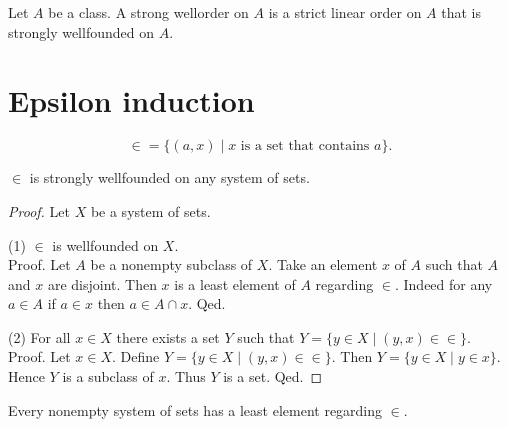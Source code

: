 \documentclass[../../set-theory/set-theory.tex]{subfiles}
\begin{document}
  \begin{forthel}
    \begin{definition}
      Let $A$ be a class.
      A strong wellorder on $A$ is a strict linear order on $A$ that is
      strongly wellfounded on $A$.
    \end{definition}
  \end{forthel}


  \section{Epsilon induction}

  \begin{forthel}
    \begin{definition}
      \[ {\in} = \{ (a,x) \mid \text{$x$ is a set that contains $a$} \}. \]
    \end{definition}
  \end{forthel}

  \begin{forthel}
    \begin{proposition}
      ${\in}$ is strongly wellfounded on any system of sets.
    \end{proposition}
    \begin{proof}
      Let $X$ be a system of sets.

      (1) ${\in}$ is wellfounded on $X$. \\
      Proof.
        Let $A$ be a nonempty subclass of $X$.
        Take an element $x$ of $A$ such that $A$ and $x$ are disjoint.
        Then $x$ is a least element of $A$ regarding ${\in}$.
        Indeed for any $a \in A$ if $a \in x$ then $a \in A \cap x$.
      Qed.

      (2) For all $x \in X$ there exists a set $Y$ such that
      $Y = \{ y \in X \mid (y,x) \in {\in} \}$. \\
      Proof.
        Let $x \in X$.
        Define $Y = \{ y \in X \mid (y,x) \in {\in} \}$.
        Then $Y = \{ y \in X \mid y \in x \}$.
        Hence $Y$ is a subclass of $x$.
        Thus $Y$ is a set.
      Qed.
    \end{proof}
  \end{forthel}

  \begin{forthel}
    \begin{corollary}
      Every nonempty system of sets has a least element regarding ${\in}$.
    \end{corollary}
  \end{forthel}
\end{document}
